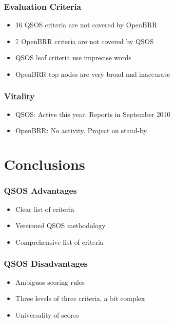 \documentclass{beamer}
\begin{document}

\begin{frame}
 \frametitle{Evaluation Criteria}
 \begin{itemize}
 \item 16 QSOS criteria are not covered by OpenBRR
 \item 7 OpenBRR criteria are not covered by QSOS
 \item QSOS leaf criteria use imprecise words
 \item OpenBRR top nodes are very broad and inaccurate
 \end{itemize}
\end{frame}


\begin{frame}
 \frametitle{Vitality}
 \begin{itemize}
 \item QSOS: Active this year. Reports in September 2010
 \item OpenBRR: No activity. Project on stand-by
 \end{itemize}
\end{frame}



\section{Conclusions}

\begin{frame}
\frametitle{QSOS Advantages}
 \begin{itemize}
 \item Clear list of criteria
 \item Versioned QSOS methodology
 \item Comprehensive list of criteria
 \end{itemize}
\end{frame}


\begin{frame}
\frametitle{QSOS Disadvantages}
 \begin{itemize}
 \item Ambiguos scoring rules
 \item Three levels of three criteria, a bit complex
 \item Universality of scores
 \end{itemize}
\end{frame}
\end{document}
